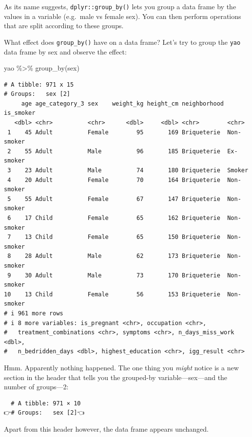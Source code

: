\documentclass[
  letterpaper,
  DIV=11,
  numbers=noendperiod]{scrreprt}
\newenvironment{Shaded}{\begin{snugshade}}{\end{snugshade}}
\newcommand{\FunctionTok}[1]{\textcolor[rgb]{0.28,0.35,0.67}{#1}}
\newcommand{\NormalTok}[1]{\textcolor[rgb]{0.00,0.23,0.31}{#1}}
\newcommand{\SpecialCharTok}[1]{\textcolor[rgb]{0.37,0.37,0.37}{#1}}
\begin{document}
As its name suggests, \texttt{dplyr::group\_by()} lets you group a data
frame by the values in a variable (e.g.~male vs female sex). You can
then perform operations that are split according to these groups.

What effect does \texttt{group\_by()} have on a data frame? Let's try to
group the \texttt{yao} data frame by sex and observe the effect:

\begin{Shaded}
\begin{Highlighting}[]
\NormalTok{yao }\SpecialCharTok{\%\textgreater{}\%} 
  \FunctionTok{group\_by}\NormalTok{(sex)}
\end{Highlighting}
\end{Shaded}

\begin{verbatim}
# A tibble: 971 x 15
# Groups:   sex [2]
     age age_category_3 sex    weight_kg height_cm neighborhood is_smoker 
   <dbl> <chr>          <chr>      <dbl>     <dbl> <chr>        <chr>     
 1    45 Adult          Female        95       169 Briqueterie  Non-smoker
 2    55 Adult          Male          96       185 Briqueterie  Ex-smoker 
 3    23 Adult          Male          74       180 Briqueterie  Smoker    
 4    20 Adult          Female        70       164 Briqueterie  Non-smoker
 5    55 Adult          Female        67       147 Briqueterie  Non-smoker
 6    17 Child          Female        65       162 Briqueterie  Non-smoker
 7    13 Child          Female        65       150 Briqueterie  Non-smoker
 8    28 Adult          Male          62       173 Briqueterie  Non-smoker
 9    30 Adult          Male          73       170 Briqueterie  Non-smoker
10    13 Child          Female        56       153 Briqueterie  Non-smoker
# i 961 more rows
# i 8 more variables: is_pregnant <chr>, occupation <chr>,
#   treatment_combinations <chr>, symptoms <chr>, n_days_miss_work <dbl>,
#   n_bedridden_days <dbl>, highest_education <chr>, igg_result <chr>
\end{verbatim}

Hmm. Apparently nothing happened. The one thing you \emph{might} notice
is a new section in the header that tells you the grouped-by
variable---sex---and the number of groups---2:

\begin{verbatim}
  # A tibble: 971 × 10
👉# Groups:   sex [2]👈
\end{verbatim}

Apart from this header however, the data frame appears unchanged.
\end{document}

